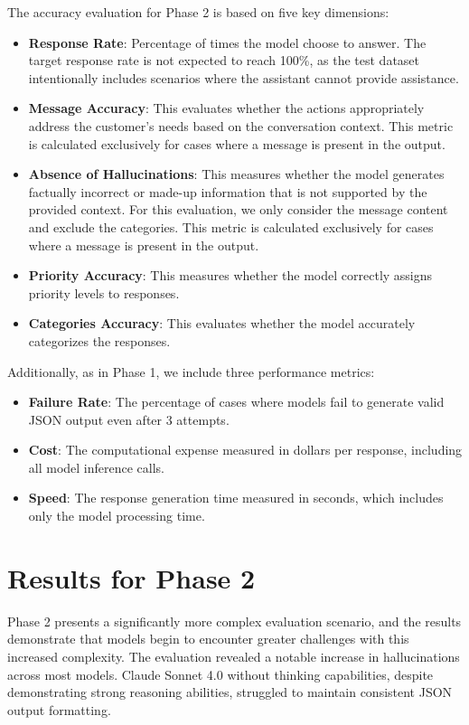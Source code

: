 The accuracy evaluation for Phase 2 is based on five key dimensions:
\begin{itemize}
    \item \textbf{Response Rate}: Percentage of times the model choose to answer. The target response rate is not expected to reach 100\%, as the test dataset intentionally includes scenarios where the assistant cannot provide assistance.
    \item \textbf{Message Accuracy}: This evaluates whether the actions appropriately address the customer's needs based on the conversation context. This metric is calculated exclusively for cases where a message is present in the output.
    \item \textbf{Absence of Hallucinations}: This measures whether the model generates factually incorrect or made-up information that is not supported by the provided context. For this evaluation, we only consider the message content and exclude the categories. This metric is calculated exclusively for cases where a message is present in the output.
    \item \textbf{Priority Accuracy}: This measures whether the model correctly assigns priority levels to responses.
    \item \textbf{Categories Accuracy}: This evaluates whether the model accurately categorizes the responses.
\end{itemize}
Additionally, as in Phase 1, we include three performance metrics:
\begin{itemize}
    \item \textbf{Failure Rate}: The percentage of cases where models fail to generate valid JSON output even after 3 attempts.
    \item \textbf{Cost}: The computational expense measured in dollars per response, including all model inference calls.
    \item \textbf{Speed}: The response generation time measured in seconds, which includes only the model processing time.
\end{itemize}

\section{Results for Phase 2}

Phase 2 presents a significantly more complex evaluation scenario, and the results demonstrate that models begin to encounter greater challenges with this increased complexity.
The evaluation revealed a notable increase in hallucinations across most models.
Claude Sonnet 4.0 without thinking capabilities, despite demonstrating strong reasoning abilities, struggled to maintain consistent JSON output formatting.

